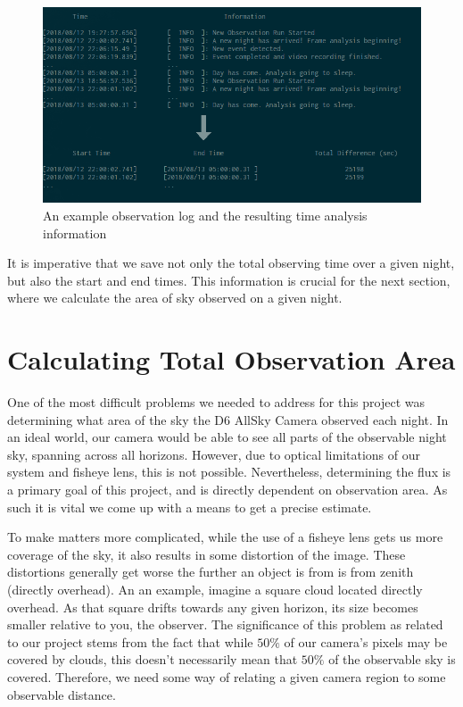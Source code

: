 \begin{figure}[ht!]
  \centering
  \includegraphics[scale=0.53]{images/obslog_time.png}
  \caption{An example observation log and the resulting time analysis information}
  \label{obslog_time}
\end{figure}

It is imperative that we save not only the total observing time over a given night, but also the start and end times. 
This information is crucial for the next section, where we calculate the area of sky observed on a given night.

\section{Calculating Total Observation Area}

One of the most difficult problems we needed to address for this project was determining what area of the sky the D6 AllSky Camera observed each night.  
In an ideal world, our camera would be able to see all parts of the observable night sky, spanning across all horizons.  
However, due to optical limitations of our system and fisheye lens, this is not possible. 
Nevertheless, determining the flux is a primary goal of this project, and is directly dependent on observation area. As such it is vital we come up with a means to get a precise estimate. 

To make matters more complicated, while the use of a fisheye lens gets us more coverage of the sky, it also results in some distortion of the image.
These distortions generally get worse the further an object is from is from zenith (directly overhead).
An an example, imagine a square cloud located directly overhead.  
As that square drifts towards any given horizon, its size becomes smaller relative to you, the observer.
The significance of this problem as related to our project stems from the fact that while $50\% $ of our camera's pixels may be covered by clouds, this doesn't necessarily mean that $50\%$ of the observable sky is covered.
Therefore, we need some way of relating a given camera region to some observable distance.

